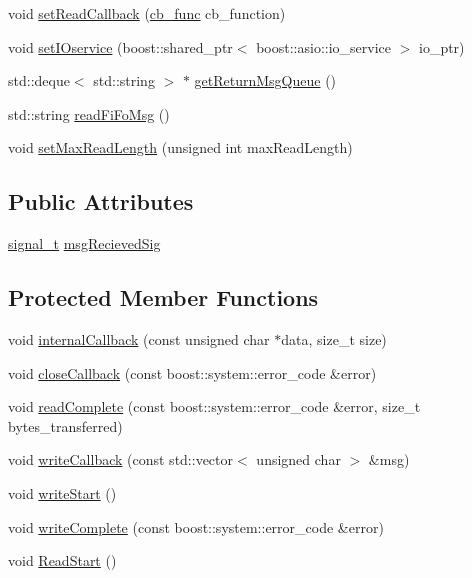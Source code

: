 \begin{DoxyCompactItemize}
\item 
void \hyperlink{classo_cpt_1_1protocol_1_1_serial_ab86f007388ac73b97fdbf14921bc1e32}{set\+Read\+Callback} (\hyperlink{classo_cpt_1_1protocol_1_1_serial_ad55591180be8bea2fe3832b1265b7496}{cb\+\_\+func} cb\+\_\+function)
\item 
void \hyperlink{classo_cpt_1_1protocol_1_1_serial_abddd54f13b696af1ca6ac0f97950708b}{set\+I\+Oservice} (boost\+::shared\+\_\+ptr$<$ boost\+::asio\+::io\+\_\+service $>$ io\+\_\+ptr)
\item 
std\+::deque$<$ std\+::string $>$ $\ast$ \hyperlink{classo_cpt_1_1protocol_1_1_serial_ad1c50382b0f52828b3111f4dc2f03bad}{get\+Return\+Msg\+Queue} ()
\item 
std\+::string \hyperlink{classo_cpt_1_1protocol_1_1_serial_a34fd0ec3f90b067eb7f749f39986d31d}{read\+Fi\+Fo\+Msg} ()
\item 
void \hyperlink{classo_cpt_1_1protocol_1_1_serial_a7362cc03343981796a601014f5cd4d55}{set\+Max\+Read\+Length} (unsigned int max\+Read\+Length)
\end{DoxyCompactItemize}
\subsection*{Public Attributes}
\begin{DoxyCompactItemize}
\item 
\hyperlink{classo_cpt_1_1protocol_1_1_serial_a53a2b70ff50e141214acfa50bbd232a8}{signal\+\_\+t} \hyperlink{classo_cpt_1_1protocol_1_1_serial_ad9abebcea610f6ea0bb9be56b7287a4b}{msg\+Recieved\+Sig}
\end{DoxyCompactItemize}
\subsection*{Protected Member Functions}
\begin{DoxyCompactItemize}
\item 
void \hyperlink{classo_cpt_1_1protocol_1_1_serial_adb32d1835a99365baa9fb97689e0b664}{internal\+Callback} (const unsigned char $\ast$data, size\+\_\+t size)
\item 
void \hyperlink{classo_cpt_1_1protocol_1_1_serial_a3abae181678a125e420092465d063526}{close\+Callback} (const boost\+::system\+::error\+\_\+code \&error)
\item 
void \hyperlink{classo_cpt_1_1protocol_1_1_serial_ac7d84ba0853d120852157c490bdcd097}{read\+Complete} (const boost\+::system\+::error\+\_\+code \&error, size\+\_\+t bytes\+\_\+transferred)
\item 
void \hyperlink{classo_cpt_1_1protocol_1_1_serial_a02f091d3e3333bc1f723216cbeb757af}{write\+Callback} (const std\+::vector$<$ unsigned char $>$ \&msg)
\item 
void \hyperlink{classo_cpt_1_1protocol_1_1_serial_a1fedc27e16c383de81e5a05fee742581}{write\+Start} ()
\item 
void \hyperlink{classo_cpt_1_1protocol_1_1_serial_a8b1037a2eefdd4215f1d4732e168272c}{write\+Complete} (const boost\+::system\+::error\+\_\+code \&error)
\item 
void \hyperlink{classo_cpt_1_1protocol_1_1_serial_a5bf4aa913654c4ebef3c48ec54cf8b03}{Read\+Start} ()
\end{DoxyCompactItemize}
